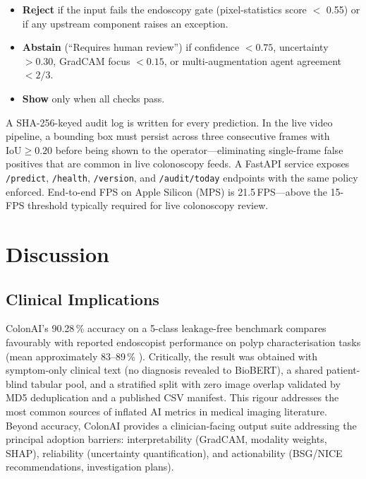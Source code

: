 \documentclass[conference]{IEEEtran}
\begin{document}
\begin{itemize}
  \item \textbf{Reject} if the input fails the endoscopy gate
        (pixel-statistics score $<$ 0.55) or if any upstream component
        raises an exception.
  \item \textbf{Abstain} (``Requires human review'') if confidence
        $< 0.75$, uncertainty $> 0.30$, GradCAM focus $< 0.15$, or
        multi-augmentation agent agreement $< 2/3$.
  \item \textbf{Show} only when all checks pass.
\end{itemize}

A SHA-256-keyed audit log is written for every prediction. In the live
video pipeline, a bounding box must persist across three consecutive
frames with $\textrm{IoU} \geq 0.20$ before being shown to the
operator---eliminating single-frame false positives that are common in
live colonoscopy feeds. A FastAPI service exposes \texttt{/predict},
\texttt{/health}, \texttt{/version}, and \texttt{/audit/today} endpoints
with the same policy enforced. End-to-end FPS on Apple Silicon (MPS) is
21.5\,FPS---above the 15-FPS threshold typically required for live
colonoscopy review.

\section{Discussion}

\subsection{Clinical Implications}

ColonAI's 90.28\,\% accuracy on a 5-class leakage-free benchmark compares
favourably with reported endoscopist performance on polyp characterisation
tasks (mean approximately 83--89\,\% \cite{miss_rate_2006_meta}). Critically,
the result was obtained with symptom-only clinical text (no diagnosis
revealed to BioBERT), a shared patient-blind tabular pool, and a
stratified split with zero image overlap validated by MD5 deduplication
and a published CSV manifest. This rigour addresses the most common
sources of inflated AI metrics in medical imaging literature. Beyond
accuracy, ColonAI provides a clinician-facing output suite addressing
the principal adoption barriers: interpretability (GradCAM, modality
weights, SHAP), reliability (uncertainty quantification), and
actionability (BSG/NICE recommendations, investigation plans).
\end{document}
